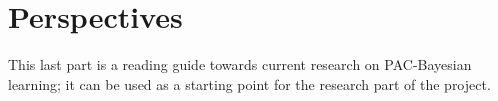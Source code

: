 \documentclass[11pt,a4paper]{article}
\numberwithin{equation}{section}
\begin{document}



\part{Perspectives}
This last part is a reading guide towards current research on PAC-Bayesian
learning; it can be used as a starting point for the research part of the project.
\clearpage


\appendix




\end{document}
